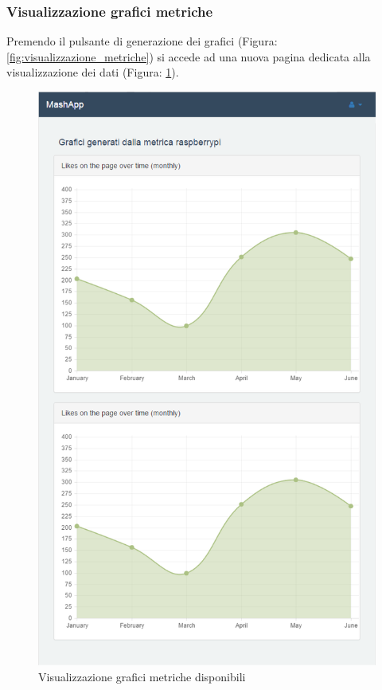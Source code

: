 		\subsubsection{Visualizzazione grafici metriche} %
		\label{sec:visualizzazione_grafici_metriche}
			Premendo il pulsante di generazione dei grafici (Figura: \ref{fig:visualizzazione_metriche}) si accede ad una nuova pagina dedicata alla visualizzazione dei dati (Figura: \ref{fig:visualizzazione_grafici_metriche}).
			\begin{figure}[H]
				\centering
				\centerline{\includegraphics[width=14cm]{images/visualizzazione_grafici_metriche.png}}
				\caption{Visualizzazione grafici metriche disponibili}
				\label{fig:visualizzazione_grafici_metriche}
			\end{figure}
